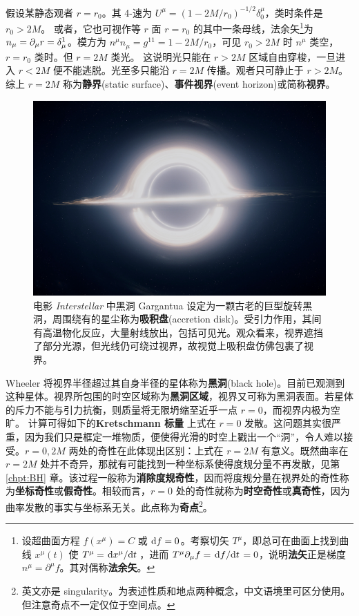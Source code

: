 假设某静态观者 $r=r_0$。其 4-速为 $U^\mu=(1-2M/r_0)^{-1/2}\delta^\mu_0$，类时条件是 $r_0>2 M$。
或者，它也可视作等 $r$ 面 $r=r_0$ 的其中一条母线，法余矢\footnote{设超曲面方程 $f(x^\mu)=C$ 或 $\dd f=0$。考察切矢 $T^\mu$，即总可在曲面上找到曲线 $x^\mu(t)$ 使 $T^\mu=\dv*{x^\mu}{t}$，进而 $T^\mu\partial_\mu f=\dv*{f}{t}=0$，说明\textbf{法矢}正是梯度 $n^\mu=\partial^\mu f$。其对偶称\textbf{法余矢}。}为 $n_\mu=\partial_\mu r=\delta^1_\mu$。模方为 $n^\mu n_\mu=g^{11}=1-2M/r_0$，可见 $r_0>2M$ 时 $n^\mu$ 类空，$r=r_0$ 类时。但 $r=2M$ 类光。
这说明光只能在 $r>2M$ 区域自由穿梭，一旦进入 $r<2M$ 便不能逃脱。光至多只能沿 $r=2M$ 传播。观者只可静止于 $r>2M$。
综上 $r=2M$ 称为\textbf{静界}(static surface)、\textbf{事件视界}(event horizon)或简称\textbf{视界}。
\begin{figure}[h!]
    \centering
    \includegraphics[width=.7\textwidth]{fig/chpt01/blackhole.jpg}
    \caption{\small 电影 \textit{Interstellar} 中黑洞 Gargantua 设定为一颗古老的巨型旋转黑洞，周围绕有的星尘称为\textbf{吸积盘}(accretion disk)。受引力作用，其间有高温物化反应，大量射线放出，包括可见光。观众看来，视界遮挡了部分光源，但光线仍可绕过视界，故视觉上吸积盘仿佛包裹了视界。}
\end{figure}

Wheeler 将视界半径超过其自身半径的星体称为\textbf{黑洞}(black hole)。目前已观测到这种星体。视界所包围的时空区域称为\textbf{黑洞区域}，视界又可称为黑洞表面。若星体的斥力不能与引力抗衡，则质量将无限坍缩至近乎一点 $r=0$，而视界内极为空旷。
计算可得如下的\textbf{Kretschmann 标量}
上式在 $r=0$ 发散。这问题其实很严重，因为我们只是框定一堆物质，便使得光滑的时空上戳出一个“洞”，令人难以接受。$r=0,2M$ 两处的奇性在此体现出区别：上式在 $r=2M$ 有意义。既然曲率在 $r=2M$ 处并不奇异，那就有可能找到一种坐标系使得度规分量不再发散，见第 \ref{chpt:BH} 章。该过程一般称为\textbf{消除度规奇性}，因而将度规分量在视界处的奇性称为\textbf{坐标奇性}或\textbf{假奇性}。相较而言，$r=0$ 处的奇性就称为\textbf{时空奇性}或\textbf{真奇性}，因为曲率发散的事实与坐标系无关。此点称为\textbf{奇点}\footnote{英文亦是 singularity。为表述性质和地点两种概念，中文语境里可区分使用。但注意奇点不一定仅位于空间点。}。

